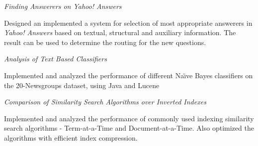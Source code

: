 \documentclass[10pt]{article}
\newcommand{\spc}{\vspace{1.2mm}}
\begin{document}
\textit{Finding Answerers on Yahoo! Answers}
\begin{compactitem}
\item {Designed an implemented a system for selection of most appropriate answerers in \emph{Yahoo! Answers} based on textual, structural and auxiliary information. The result can be used to determine the routing for the new questions.}
\end{compactitem}
\spc

\textit{Analysis of Text Based Classifiers}
\begin{compactitem}
\item {Implemented and analyzed the performance of different Na\"{\i}ve Bayes classifiers on the 20-Newsgroups dataset, using Java and Lucene}
\end{compactitem}
\spc

\textit{Comparison of Similarity Search Algorithms over Inverted Indexes}
\begin{compactitem}
\item {Implemented and analyzed the performance of commonly used indexing similarity search algorithms - Term-at-a-Time and Document-at-a-Time. Also optimized the algorithms  with efficient index compression.}
\end{compactitem}
\spc



\end{document}
